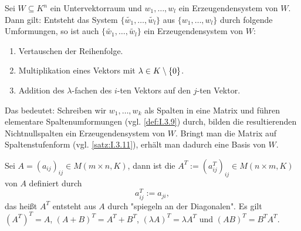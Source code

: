 \begin{satz}
	\label{satz:I.9.4}
	Sei $W \subseteq K^n$ ein Untervektorraum und $w_1,\dots,w_l$ ein Erzeugendensystem von $W$.
	Dann gilt:
	Entsteht das System $\{\widetilde{w_1},\dots,\widetilde{w_l}\}$ aus $\{w_1,\dots,w_l\}$ durch folgende Umformungen, so ist auch $\{\widetilde{w_1},\dots,\widetilde{w_l}\}$ ein Erzeugendensystem von $W$:
	\begin{enumerate}[(1)]
		\item Vertauschen der Reihenfolge.
		\item Multiplikation eines Vektors mit $\lambda \in K \setminus \{0\}$.
		\item Addition des $\lambda$-fachen des $i$-ten Vektors auf den $j$-ten Vektor.
	\end{enumerate}
	Das bedeutet:
	Schreiben wir $w_1,\dots,w_k$ als Spalten in eine Matrix und führen elementare Spaltenumformungen (vgl. \autoref{def:I.3.9}) durch, bilden die resultierenden Nichtnullspalten ein Erzeugendensystem von $W$.
	Bringt man die Matrix auf Spaltenstufenform (vgl. \autoref{satz:I.3.11}), erhält man dadurch eine Basis von $W$.
\end{satz}
\newpage
\begin{definition}
	\label{def:I.9.5}
	Sei $A = (a_{ij})_{ij} \in M(m \times n,K)$, dann ist die  $A^T := (a_{ij}^T)_{ij} \in M(n \times m,K)$ von $A$ definiert durch
	\[
		a_{ij}^T := a_{ji},
	\]
	das heißt $A^T$ entsteht aus $A$ durch "spiegeln an der Diagonalen".
	Es gilt $(A^T)^T = A$, $(A+B)^T = A^T + B^T$, $(\lambda A)^T = \lambda A^T$ und $(AB)^T = B^T A^T$.
\end{definition}